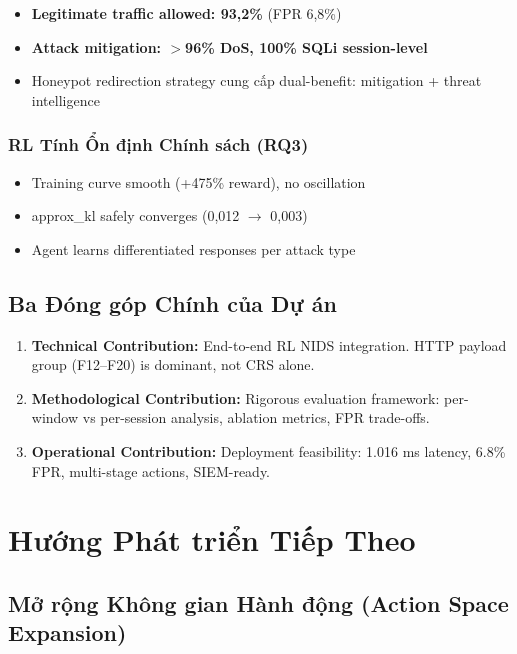 \documentclass[12pt,a4paper,twoside]{report}
\begin{document}
\begin{itemize}
\item \textbf{Legitimate traffic allowed: 93,2\%} (FPR 6,8\%)
\item \textbf{Attack mitigation: $>$96\% DoS, 100\% SQLi session-level}
\item Honeypot redirection strategy cung cấp dual-benefit: mitigation + threat intelligence
\end{itemize}

\subsubsection{RL Tính Ổn định Chính sách (RQ3)}

\begin{itemize}
\item Training curve smooth (+475\% reward), no oscillation
\item approx\_kl safely converges (0,012 $\to$ 0,003)
\item Agent learns differentiated responses per attack type
\end{itemize}

\subsection{Ba Đóng góp Chính của Dự án}

\begin{enumerate}
\item \textbf{Technical Contribution:} End-to-end RL NIDS integration. HTTP payload group (F12--F20) is dominant, not CRS alone.

\item \textbf{Methodological Contribution:} Rigorous evaluation framework: per-window vs per-session analysis, ablation metrics, FPR trade-offs.

\item \textbf{Operational Contribution:} Deployment feasibility: 1.016 ms latency, 6.8\% FPR, multi-stage actions, SIEM-ready.
\end{enumerate}

\section{Hướng Phát triển Tiếp Theo}

\subsection{Mở rộng Không gian Hành động (Action Space Expansion)}
\end{document}
